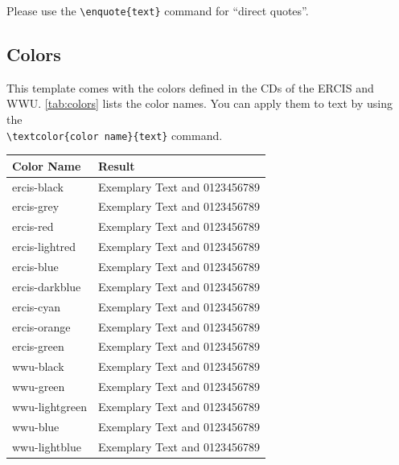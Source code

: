 Please use the \texttt{\textbackslash enquote\{text\}} command for \enquote{direct quotes}.

\subsection{Colors}
This template comes with the colors defined in the \glspl{CD} of the \acrshort{ERCIS} and \acrshort{WWU}. \Tab \ref{tab:colors} lists the color names. You can apply them to text by using the  \\ \texttt{\textbackslash textcolor\{color name\}\{text\}} command.
	
\begin{table}[caption={Colors defined by the template}, label=tab:colors]
	\centering
		\begin{tabular}{@{}ll@{}}
			\toprule
			{\bf Color Name} & {\bf Result} \\ \midrule
			ercis-black      & \textcolor{ercis-black}{Exemplary Text and 0123456789}  \\
			ercis-grey      & \textcolor{ercis-grey}{Exemplary Text and 0123456789}  \\
			ercis-red      & \textcolor{ercis-red}{Exemplary Text and 0123456789}  \\
			ercis-lightred      & \textcolor{ercis-lightred}{Exemplary Text and 0123456789}  \\
			ercis-blue      & \textcolor{ercis-blue}{Exemplary Text and 0123456789}  \\
			ercis-darkblue      & \textcolor{ercis-darkblue}{Exemplary Text and 0123456789}  \\
			ercis-cyan    & \textcolor{ercis-cyan}{Exemplary Text and 0123456789}  \\
			ercis-orange      & \textcolor{ercis-orange}{Exemplary Text and 0123456789}  \\
			ercis-green      & \textcolor{ercis-green}{Exemplary Text and 0123456789}  \\ \midrule
			wwu-black      & \textcolor{wwu-black}{Exemplary Text and 0123456789}  \\
			wwu-green      & \textcolor{wwu-green}{Exemplary Text and 0123456789}  \\
			wwu-lightgreen      & \textcolor{wwu-lightgreen}{Exemplary Text and 0123456789}  \\
			wwu-blue     & \textcolor{wwu-blue}{Exemplary Text and 0123456789}  \\
			wwu-lightblue      & \textcolor{wwu-lightblue}{Exemplary Text and 0123456789}  \\ \bottomrule
		\end{tabular}
\end{table}


